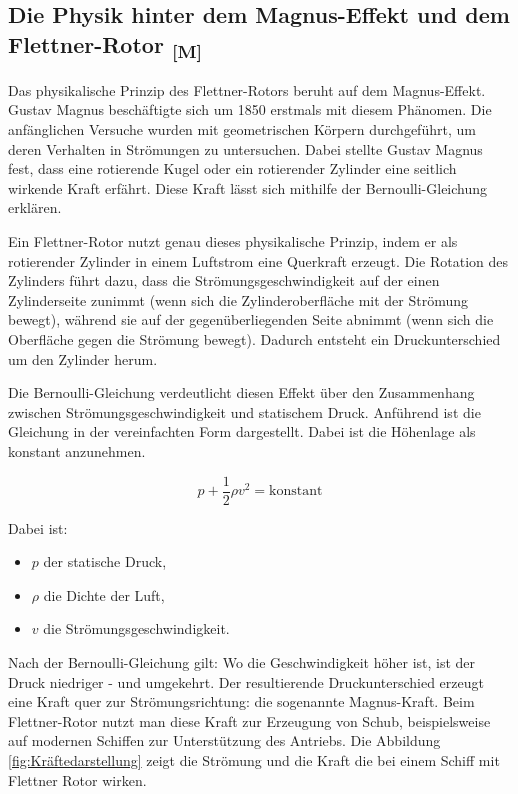 \documentclass[a4paper,12pt]{article}
\begin{document}
\subsection{\texorpdfstring{Die Physik hinter dem Magnus-Effekt und dem Flettner-Rotor \textsubscript{[M]}}{Die Physik hinter dem Magnus-Effekt und dem Flettner-Rotor [M]}}
Das physikalische Prinzip des Flettner-Rotors beruht auf dem Magnus-Effekt. Gustav Magnus beschäftigte sich um 1850 erstmals mit diesem Phänomen. Die anfänglichen Versuche wurden mit geometrischen Körpern durchgeführt, um deren Verhalten in Strömungen zu untersuchen. Dabei stellte Gustav Magnus fest, dass eine rotierende Kugel oder ein rotierender Zylinder eine seitlich wirkende Kraft erfährt. Diese Kraft lässt sich mithilfe der Bernoulli-Gleichung erklären.\cite{Flettner_Uni_Flensburg}\newline

Ein Flettner-Rotor nutzt genau dieses physikalische Prinzip, indem er als rotierender Zylinder in einem Luftstrom eine Querkraft erzeugt. Die Rotation des Zylinders führt dazu, dass die Strömungsgeschwindigkeit auf der einen Zylinderseite zunimmt (wenn sich die Zylinderoberfläche mit der Strömung bewegt), während sie auf der gegenüberliegenden Seite abnimmt (wenn sich die Oberfläche gegen die Strömung bewegt). Dadurch entsteht ein Druckunterschied um den Zylinder herum.

Die Bernoulli-Gleichung verdeutlicht diesen Effekt über den Zusammenhang zwischen Strömungsgeschwindigkeit und statischem Druck. Anführend ist die Gleichung in der vereinfachten Form dargestellt. Dabei ist die Höhenlage als konstant anzunehmen.

\begin{equation}
p + \frac{1}{2} \rho v^2 = \text{konstant}
\end{equation}

Dabei ist:
\begin{itemize}
    \item $p$ der statische Druck,
    \item $\rho$ die Dichte der Luft,
    \item $v$ die Strömungsgeschwindigkeit.
\end{itemize}

Nach der Bernoulli-Gleichung gilt: Wo die Geschwindigkeit höher ist, ist der Druck niedriger - und umgekehrt. Der resultierende Druckunterschied erzeugt eine Kraft quer zur Strömungsrichtung: die sogenannte Magnus-Kraft.
Beim Flettner-Rotor nutzt man diese Kraft zur Erzeugung von Schub, beispielsweise auf modernen Schiffen zur Unterstützung des Antriebs.
Die Abbildung \ref{fig:Kräftedarstellung} zeigt die Strömung und die Kraft die bei einem Schiff mit Flettner Rotor wirken.\cite{Flettner_Rotor_Wiki}
\end{document}
